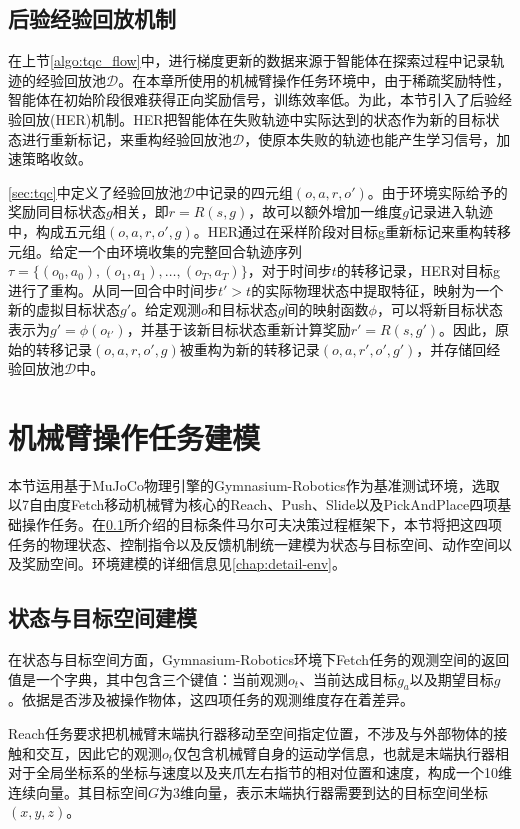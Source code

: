 \subsection{后验经验回放机制}\label{sec:her}
在上节\cref{algo:tqc_flow}中，进行梯度更新的数据来源于智能体在探索过程中记录轨迹的经验回放池$\mathcal{D}$。在本章所使用的机械臂操作任务环境中，由于稀疏奖励特性，智能体在初始阶段很难获得正向奖励信号，训练效率低。为此，本节引入了后验经验回放(HER)\cite{andrychowicz2018hindsight}机制。HER把智能体在失败轨迹中实际达到的状态作为新的目标状态进行重新标记，来重构经验回放池$\mathcal{D}$，使原本失败的轨迹也能产生学习信号，加速策略收敛。

\cref{sec:tqc}中定义了经验回放池$\mathcal{D}$中记录的四元组$(o, a, r, o')$。由于环境实际给予的奖励同目标状态$g$相关，即$r=R(s, g)$，故可以额外增加一维度$g$记录进入轨迹中，构成五元组$(o, a, r, o', g)$。HER通过在采样阶段对目标g重新标记来重构转移元组。给定一个由环境收集的完整回合轨迹序列$\tau = \{(o_0, a_0), (o_1, a_1), \ldots, (o_T, a_T)\}$，对于时间步$t$的转移记录，HER对目标g进行了重构。从同一回合中时间步$t' > t$的实际物理状态中提取特征，映射为一个新的虚拟目标状态$g'$。给定观测$o$和目标状态$g$间的映射函数$\phi$，可以将新目标状态表示为$g' = \phi(o_{t'})$，并基于该新目标状态重新计算奖励$r' = R(s, g')$。因此，原始的转移记录$(o, a, r, o', g)$被重构为新的转移记录$(o, a, r', o', g')$，并存储回经验回放池$\mathcal{D}$中。

\section{机械臂操作任务建模}\label{sec:rl-environment}
本节运用基于MuJoCo物理引擎的Gymnasium-Robotics作为基准测试环境，选取以7自由度Fetch移动机械臂为核心的Reach、Push、Slide以及PickAndPlace四项基础操作任务。在\cref{sec:her}所介绍的目标条件马尔可夫决策过程框架下，本节将把这四项任务的物理状态、控制指令以及反馈机制统一建模为状态与目标空间、动作空间以及奖励空间。环境建模的详细信息见\cref{chap:detail-env}。

\subsection{状态与目标空间建模}\label{sec:state-space}
在状态与目标空间方面，Gymnasium-Robotics环境下Fetch任务的观测空间的返回值是一个字典，其中包含三个键值：当前观测$o_t$、当前达成目标$g_a$以及期望目标$g$。依据是否涉及被操作物体，这四项任务的观测维度存在着差异。

Reach任务要求把机械臂末端执行器移动至空间指定位置，不涉及与外部物体的接触和交互，因此它的观测$o_t$仅包含机械臂自身的运动学信息，也就是末端执行器相对于全局坐标系的坐标与速度以及夹爪左右指节的相对位置和速度，构成一个10维连续向量。其目标空间$G$为3维向量，表示末端执行器需要到达的目标空间坐标$(x, y, z)$。

